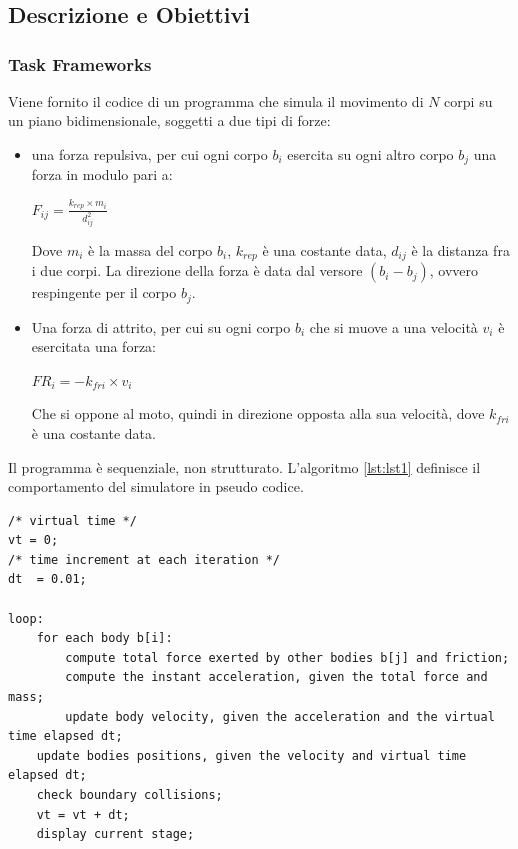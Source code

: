 \documentclass[12pt,a4paper,openright,twoside]{book}
\begin{document}
	
\frontmatter



\tableofcontents   

\mainmatter

\chapter{\introductionname}
\label{chap:introduction}
\section{Descrizione e Obiettivi}
\subsection{Task Frameworks}
Viene fornito il codice di un programma che simula il movimento di $N$ corpi su un piano bidimensionale,
soggetti a due tipi di forze:
\begin{itemize}
	\item una forza repulsiva, per cui ogni corpo $b_{i}$ esercita su ogni altro corpo $b_{j}$ una forza in modulo pari a:
	\begin{center}
		$ F_{ij} = \frac{k_{rep} \times m_{i}}{d^2_{ij}} $
	\end{center}
	Dove $m_{i}$ è la massa del corpo $b_{i}$, $k_{rep}$ è una costante data, $d_{ij}$ è la distanza fra i due corpi.
	La direzione della forza è data dal versore $(b_{i} - b_{j})$, ovvero respingente per il corpo $b_{j}$.
	\item Una forza di attrito, per cui su ogni corpo $b_{i}$ che si muove a una velocità $v_{i}$ è esercitata una forza:
	\begin{center}
		$ FR_{i} = - k_{fri} \times v_{i} $
	\end{center}
	Che si oppone al moto, quindi in direzione opposta alla sua velocità, dove $k_{fri}$ è una costante data.
\end{itemize}
Il programma è sequenziale, non strutturato. 
L'algoritmo \ref{lst:lst1} definisce il comportamento del simulatore in pseudo codice.
\newpage
\begin{lstlisting}[label=lst:lst1,caption=Pseudocodice del programma sequenziale]
/* virtual time */
vt = 0;
/* time increment at each iteration */     
dt  = 0.01;

loop:
	for each body b[i]:
		compute total force exerted by other bodies b[j] and friction;
		compute the instant acceleration, given the total force and mass;
		update body velocity, given the acceleration and the virtual time elapsed dt;
	update bodies positions, given the velocity and virtual time elapsed dt;
	check boundary collisions;
	vt = vt + dt;   
	display current stage;

\end{lstlisting}
\end{document}
